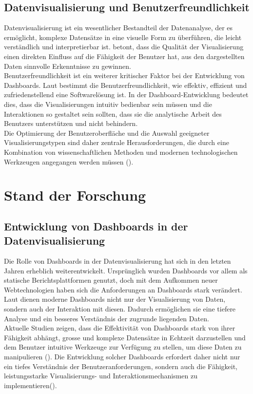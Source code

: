 \documentclass[a4paper, 12pt]{scrartcl}
\begin{document}
\subsection{Datenvisualisierung und Benutzerfreundlichkeit}
Datenvisualisierung ist ein wesentlicher Bestandteil der Datenanalyse, der es ermöglicht, komplexe Datensätze in eine visuelle Form zu überführen, die leicht verständlich und interpretierbar ist. \textcite{Nair2018} betont, dass die Qualität der Visualisierung einen direkten Einfluss auf die Fähigkeit der Benutzer hat, aus den dargestellten Daten sinnvolle Erkenntnisse zu gewinnen.\\[1em]Benutzerfreundlichkeit ist ein weiterer kritischer Faktor bei der Entwicklung von Dashboards. Laut \textcite{Desai2016} bestimmt die Benutzerfreundlichkeit, wie effektiv, effizient und zufriedenstellend eine Softwarelösung ist. In der Dashboard-Entwicklung bedeutet dies, dass die Visualisierungen intuitiv bedienbar sein müssen und die Interaktionen so gestaltet sein sollten, dass sie die analytische Arbeit des Benutzers unterstützen und nicht behindern.\\[1em]Die Optimierung der Benutzeroberfläche und die Auswahl geeigneter Visualisierungstypen sind daher zentrale Herausforderungen, die durch eine Kombination von wissenschaftlichen Methoden und modernen technologischen Werkzeugen angegangen werden müssen (\cite{Saket2019}).
\clearpage
	\section{Stand der Forschung}
	\label{sec:standDerForschung}

\subsection{Entwicklung von Dashboards in der Datenvisualisierung}
Die Rolle von Dashboards in der Datenvisualisierung hat sich in den letzten Jahren erheblich weiterentwickelt. Ursprünglich wurden Dashboards vor allem als statische Berichtsplattformen genutzt, doch mit dem Aufkommen neuer Webtechnologien haben sich die Anforderungen an Dashboards stark verändert. Laut \textcite{Nunes2020} dienen moderne Dashboards nicht nur der Visualisierung von Daten, sondern auch der Interaktion mit diesen. Dadurch ermöglichen sie eine tiefere Analyse und ein besseres Verständnis der zugrunde liegenden Daten.\\[1em] Aktuelle Studien zeigen, dass die Effektivität von Dashboards stark von ihrer Fähigkeit abhängt, grosse und komplexe Datensätze in Echtzeit darzustellen und dem Benutzer intuitive Werkzeuge zur Verfügung zu stellen, um diese Daten zu manipulieren (\cite{Stehle2019}). Die Entwicklung solcher Dashboards erfordert daher nicht nur ein tiefes Verständnis der Benutzeranforderungen, sondern auch die Fähigkeit, leistungsstarke Visualisierungs- und Interaktionsmechanismen zu implementieren(\cite{Setlur2023}).
\end{document}
